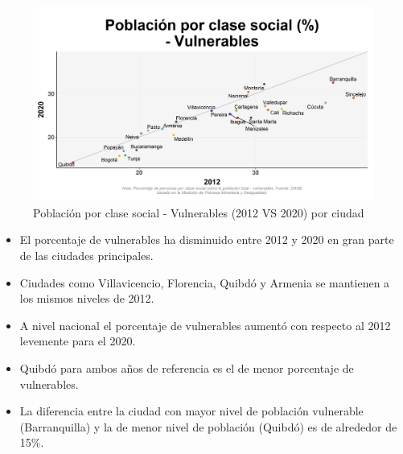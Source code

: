     \begin{figure}[H]
        \caption{Población por clase social - Vulnerables (2012 VS 2020) por ciudad \label{map_result_2} }
        \begin{center}
        \includegraphics[width=\textwidth,keepaspectratio]{img/var_244_scatter_time.png}
        \end{center}
    \end{figure}
            \begin{itemize}
                    \item El porcentaje de vulnerables ha disminuido entre 2012 y 2020 en gran parte de las ciudades principales.
                    \item Ciudades como Villavicencio, Florencia, Quibdó y Armenia se mantienen a los mismos niveles de 2012.
                    \item A nivel nacional el porcentaje de vulnerables aumentó con respecto al 2012 levemente para el 2020.
                    \item Quibdó para ambos años de referencia es el de menor porcentaje de vulnerables.
                    \item La diferencia entre la ciudad con mayor nivel de población vulnerable (Barranquilla) y la de menor nivel de población (Quibdó) es de alrededor de 15\%.
                    \end{itemize}

